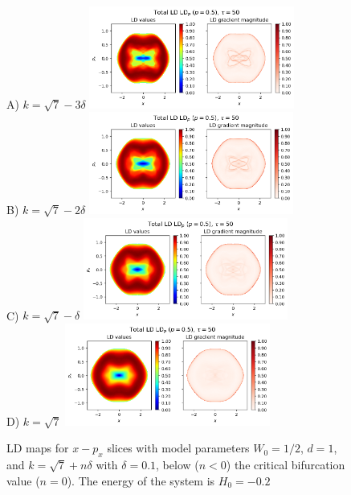 \documentclass[10pt,aps,onecolumn,superscriptaddress]{revtex4-2}
\begin{document}
\begin{figure}
    \centering
    A) $k = \sqrt{7} -3 \delta$ \includegraphics[width=0.6\textwidth]{LD_H0_-0_2_x-px_PES_bifurcation_n_-3.png}\\
    B) $k = \sqrt{7} -2 \delta$ \includegraphics[width=0.6\textwidth]{LD_H0_-0_2_x-px_PES_bifurcation_n_-2.png}\\
    C) $k = \sqrt{7} - \delta$ \includegraphics[width=0.6\textwidth]{LD_H0_-0_2_x-px_PES_bifurcation_n_-1.png}\\
    D) $k = \sqrt{7}$ \includegraphics[width=0.6\textwidth]{LD_H0_-0_2_x-px_PES_bifurcation_n_0.png}
    \caption{LD maps for $x-p_x$ slices with model parameters $W_0 = 1/2$, $d = 1$, and $k = \sqrt{7} + n \delta$ with $\delta = 0.1$, below ($n < 0$) the critical bifurcation value ($n = 0$). The energy of the system is $H_0 = -0.2$}
\end{figure}
\end{document}
